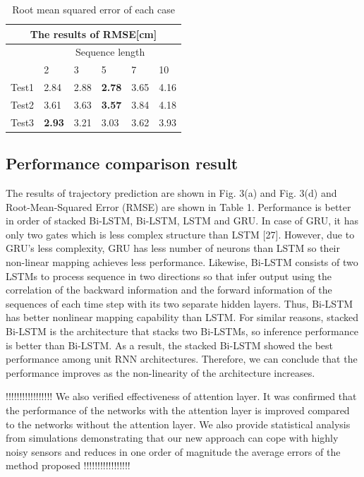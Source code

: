 \documentclass{ieeeaccess}
\begin{document}
\begin{table}[h]
	\centering
	\caption{Root mean squared error of each case}
	\begin{tabular}{clllll}
		\toprule
		\multicolumn{6}{c}{The results of RMSE[cm]}                         \\
		\midrule
		& \multicolumn{5}{c}{Sequence length} \\  \cmidrule{2-6}
		
		\multicolumn{1}{l}{} & 2     & 3       & 5      & 7    & 10  \\
		Test1                & 2.84  & 2.88    & \textbf{2.78}   & 3.65 & 4.16 \\
		Test2                & 3.61  & 3.63    & \textbf{3.57}   & 3.84 & 4.18 \\
		Test3                & \textbf{2.93}  & 3.21    & 3.03   & 3.62 & 3.93 \\
		\bottomrule 
		
	\end{tabular}
	\label{table:RMSE_sequence}
\end{table}

\subsection{Performance comparison result}

The results of trajectory prediction are shown in Fig. 3(a) and Fig. 3(d) and
Root-Mean-Squared Error (RMSE) are shown in Table 1. Performance is better
in order of stacked Bi-LSTM, Bi-LSTM, LSTM and GRU. In case of GRU, it
has only two gates which is less complex structure than LSTM [27]. However,
due to GRU's less complexity, GRU has less number of neurons than LSTM so
their non-linear mapping achieves less performance. Likewise, Bi-LSTM consists
of two LSTMs to process sequence in two directions so that infer output using
the correlation of the backward information and the forward information of the
sequences of each time step with its two separate hidden layers. Thus, Bi-LSTM
has better nonlinear mapping capability than LSTM. For similar reasons, stacked
Bi-LSTM is the architecture that stacks two Bi-LSTMs, so inference performance
is better than Bi-LSTM. As a result, the stacked Bi-LSTM showed the best
performance among unit RNN architectures. Therefore, we can conclude that
the performance improves as the non-linearity of the architecture increases.


!!!!!!!!!!!!!!!!!
We also verified effectiveness of attention layer. It was confirmed that the performance of the networks with the attention layer is improved compared to the networks without the attention layer.
 We also provide statistical analysis from simulations demonstrating that
our new approach can cope with highly noisy sensors and
reduces in one order of magnitude the average errors of the
method proposed
!!!!!!!!!!!!!!!!!
\end{document}
